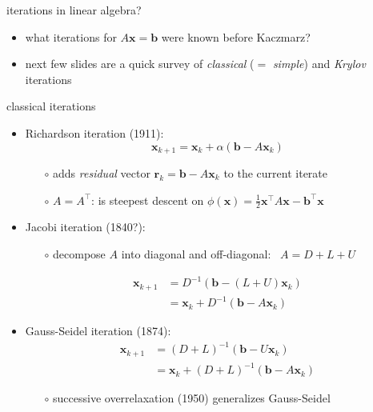 \documentclass[usepdftitle=false,usenames,dvipsnames]{beamer}
\newcommand{\bb}{\mathbf{b}}
\newcommand{\br}{\mathbf{r}}
\newcommand{\bx}{\mathbf{x}}
\begin{document}
\begin{frame}{iterations in linear algebra?}

\begin{itemize}
\item what iterations for $A\bx=\bb$ were known before Kaczmarz?
\item next few slides are a quick survey of \emph{classical} ($=$ \emph{simple}) and \emph{Krylov} iterations
\end{itemize}
\end{frame}


\begin{frame}{classical iterations}

\begin{itemize}
\item Richardson iteration (1911):
    $$\bx_{k+1} = \bx_k + \alpha (\bb - A \bx_k)$$

    \begin{itemize}
    \item[$\circ$] adds \emph{residual} vector $\br_k = \bb - A \bx_k$ to the current iterate
    \item[$\circ$] $A=A^\top$: is steepest descent on $\phi(\bx) = \frac{1}{2} \bx^\top A \bx - \bb^\top \bx$
    \end{itemize}
\item Jacobi iteration (1840?):
    \begin{itemize}
    \item[$\circ$] decompose $A$ into diagonal and off-diagonal: \, $A = D + L + U$
    \end{itemize}
\begin{align*}
\bx_{k+1} &= D^{-1} \left(\bb - (L+U) \bx_k\right) \\
          &= \bx_k + D^{-1} (\bb - A \bx_k)
\end{align*}
\item Gauss-Seidel iteration (1874):
\begin{align*}
\bx_{k+1} &= (D+L)^{-1} \left(\bb - U \bx_k\right) \\
          &= \bx_k + (D+L)^{-1} (\bb - A \bx_k)
\end{align*}

    \begin{itemize}
    \item[$\circ$] successive overrelaxation (1950) generalizes Gauss-Seidel
    \end{itemize}
\end{itemize}
\end{frame}
\end{document}

